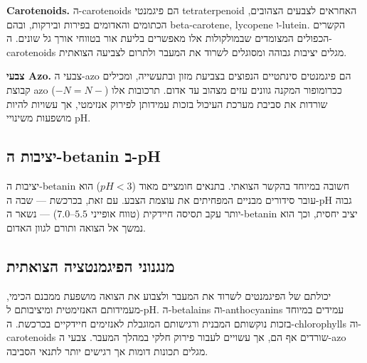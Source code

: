 \begin{hebrew}\textbf{\textenglish{Carotenoids}.} ה-\textenglish{carotenoids} הם פיגמנטי \textenglish{tetraterpenoid} האחראים לצבעים הצהובים, הכתומים והאדומים בפירות ובירקות, ובהם \textenglish{beta-carotene}, \textenglish{lycopene} ו-\textenglish{lutein}. הקשרים הכפולים המצומדים שבמולקולות אלו מאפשרים בליעת אור בטווחי אורך גל שונים. ה-\textenglish{carotenoids} מגלים יציבות גבוהה ומסוגלים לשרוד את המעבר ולתרום לצביעה הצואתית.\end{hebrew}

\begin{hebrew}\textbf{צבעי \textenglish{Azo}.} צבעי ה-\textenglish{azo} הם פיגמנטים סינתטיים הנפוצים בצביעת מזון ובתעשייה, ומכילים קבוצת \textenglish{azo} ($-N{=}N-$) ככרומופור המקנה גוונים עזים מצהוב עד אדום. תרכובות אלו שורדות את סביבת מערכת העיכול בזכות עמידותן לפירוק אנזימטי, אך עשויות להיות מושפעות משינויי \textenglish{pH}.\end{hebrew}

\subsection{\texthebrew{יציבות ה-\textenglish{betanin} ב-\textenglish{pH}}}

\begin{hebrew}יציבות ה-\textenglish{betanin} חשובה במיוחד בהקשר הצואתי. בתנאים חומציים מאוד ($pH < 3$) הוא עובר סידורים מבניים המפחיתים את עוצמת הצבע. עם זאת, בכרכשת — שבה ה-\textenglish{pH} גבוה יותר עקב תסיסה חיידקית (טווח אופייני $5.5$--$7.0$) — נשאר ה-\textenglish{betanin} יציב יחסית, וכך הוא נמשך אל הצואה ותורם לגוון האדום.\end{hebrew}

\subsection{\texthebrew{מנגנוני הפיגמנטציה הצואתית}}

\begin{hebrew}יכולתם של הפיגמנטים לשרוד את המעבר ולצבוע את הצואה מושפעת ממבנם הכימי, מעמידותם האנזימטית ומיציבותם ל-\textenglish{pH}. ה-\textenglish{betalains} וה-\textenglish{anthocyanins} עמידים במיוחד בזכות נוקשותם המבנית ורגישותם המוגבלת לאנזימים חיידקיים בכרכשת. ה-\textenglish{chlorophylls} וה-\textenglish{carotenoids} שורדים אף הם, אך עשויים לעבור פירוק חלקי במהלך המעבר. צבעי ה-\textenglish{azo} מגלים תכונות דומות אך רגישים יותר לתנאי הסביבה.\end{hebrew}

